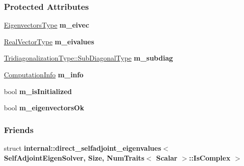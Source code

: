 \subsubsection*{Protected Attributes}
\begin{DoxyCompactItemize}
\item 
\mbox{\label{group___eigenvalues___module_a4c86f72288084ac48c2b6493a893bae4}} 
\hyperlink{group___core___module}{Eigenvectors\+Type} {\bfseries m\+\_\+eivec}
\item 
\mbox{\label{group___eigenvalues___module_a1ba3c7fe4703ee7eed528a18e53b0289}} 
\hyperlink{group___eigenvalues___module_acd090d5fdfc3cc017a13b6d8daa92287}{Real\+Vector\+Type} {\bfseries m\+\_\+eivalues}
\item 
\mbox{\label{group___eigenvalues___module_a5da95aa467ce0555d01a69ba357f62bb}} 
\hyperlink{group___core___module_class_eigen_1_1_matrix}{Tridiagonalization\+Type\+::\+Sub\+Diagonal\+Type} {\bfseries m\+\_\+subdiag}
\item 
\mbox{\label{group___eigenvalues___module_a7d3a941711a788da32be6cc6126e698b}} 
\hyperlink{group__enums_ga85fad7b87587764e5cf6b513a9e0ee5e}{Computation\+Info} {\bfseries m\+\_\+info}
\item 
\mbox{\label{group___eigenvalues___module_a7619df2065e46bde1f509cae1bc15a97}} 
bool {\bfseries m\+\_\+is\+Initialized}
\item 
\mbox{\label{group___eigenvalues___module_a26697e6c17e490fd4f6315276c597fb1}} 
bool {\bfseries m\+\_\+eigenvectors\+Ok}
\end{DoxyCompactItemize}
\subsubsection*{Friends}
\begin{DoxyCompactItemize}
\item 
\mbox{\label{group___eigenvalues___module_ac6b52963cfee7ba77cf9f2314b29546b}} 
struct {\bfseries internal\+::direct\+\_\+selfadjoint\+\_\+eigenvalues$<$ Self\+Adjoint\+Eigen\+Solver, Size, Num\+Traits$<$ Scalar $>$\+::\+Is\+Complex $>$}
\end{DoxyCompactItemize}


